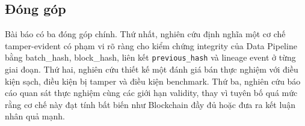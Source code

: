 \subsection{Đóng góp}\label{sec:donggop}

Bài báo có ba đóng góp chính. Thứ nhất, nghiên cứu định nghĩa một cơ chế
tamper-evident có phạm vi rõ ràng cho kiểm chứng integrity của Data
Pipeline bằng batch\_hash, block\_hash, liên kết \texttt{previous\_hash} và lineage
event ở từng giai đoạn. Thứ hai, nghiên cứu thiết kế một đánh giá bán thực
nghiệm với điều kiện sạch, điều kiện bị tamper và điều kiện benchmark.
Thứ ba, nghiên cứu báo cáo quan sát thực nghiệm cùng các giới hạn
validity, thay vì tuyên bố quá mức rằng cơ chế này đạt tính bất biến như
Blockchain đầy đủ hoặc đưa ra kết luận nhân quả mạnh.
